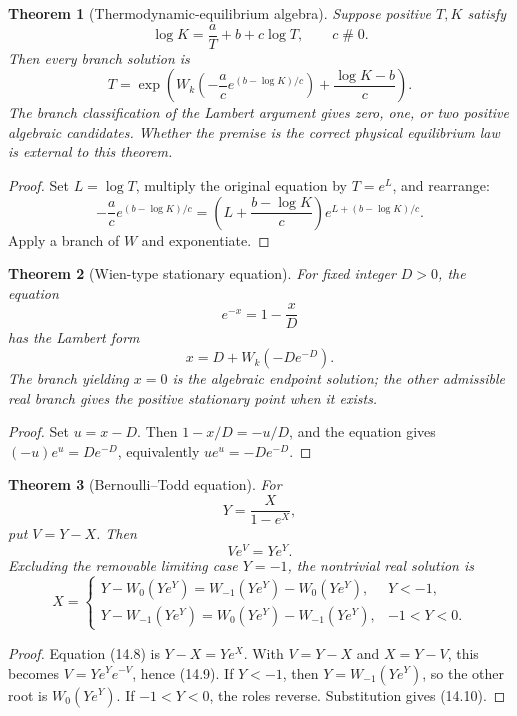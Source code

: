 \documentclass[11pt]{article}
\newtheorem{theorem}{Theorem}[section]
\theoremstyle{definition}
\newcommand{\apart}{\mathrel{\#}}
\begin{document}
\begin{theorem}[Thermodynamic-equilibrium algebra]\label{thm:thermo}
Suppose positive \(T,K\) satisfy
\[
 \log K=\frac aT+b+c\log T,
 \qquad c\apart0.
\]
Then every branch solution is
\[
 T=\exp\!\left(
 W_k\!\left(-\frac ac e^{(b-\log K)/c}\right)
 +\frac{\log K-b}{c}\right).
 \tag{14.6}
\]
The branch classification of the Lambert argument gives zero, one, or two
positive algebraic candidates.  Whether the premise is the correct physical
equilibrium law is external to this theorem.
\end{theorem}

\begin{proof}
Set \(L=\log T\), multiply the original equation by \(T=e^L\), and rearrange:
\[
 -\frac ac e^{(b-\log K)/c}
 =\left(L+\frac{b-\log K}{c}\right)
 e^{L+(b-\log K)/c}.
\]
Apply a branch of \(W\) and exponentiate.
\end{proof}

\begin{theorem}[Wien-type stationary equation]\label{thm:wien}
For fixed integer \(D>0\), the equation
\[
 e^{-x}=1-\frac{x}{D}
\]
has the Lambert form
\[
 x=D+W_k(-De^{-D}).
 \tag{14.7}
\]
The branch yielding \(x=0\) is the algebraic endpoint solution; the other
admissible real branch gives the positive stationary point when it exists.
\end{theorem}

\begin{proof}
Set \(u=x-D\).  Then \(1-x/D=-u/D\), and the equation gives
\((-u)e^{u}=De^{-D}\), equivalently \(u e^u=-De^{-D}\).
\end{proof}

\begin{theorem}[Bernoulli--Todd equation]\label{thm:todd}
For
\[
 Y=\frac{X}{1-e^X},
 \tag{14.8}
\]
put \(V=Y-X\).  Then
\[
 Ve^V=Ye^Y.
 \tag{14.9}
\]
Excluding the removable limiting case \(Y=-1\), the nontrivial real solution is
\[
 X=\begin{cases}
 Y-W_0(Ye^Y)=W_{-1}(Ye^Y)-W_0(Ye^Y),&Y<-1,\\
 Y-W_{-1}(Ye^Y)=W_0(Ye^Y)-W_{-1}(Ye^Y),&-1<Y<0.
 \end{cases}
 \tag{14.10}
\]
\end{theorem}

\begin{proof}
Equation (14.8) is \(Y-X=Ye^X\).  With \(V=Y-X\) and
\(X=Y-V\), this becomes \(V=Ye^Y e^{-V}\), hence (14.9).  If \(Y<-1\), then
\(Y=W_{-1}(Ye^Y)\), so the other root is \(W_0(Ye^Y)\).  If
\(-1<Y<0\), the roles reverse.  Substitution gives (14.10).
\end{proof}
\end{document}
